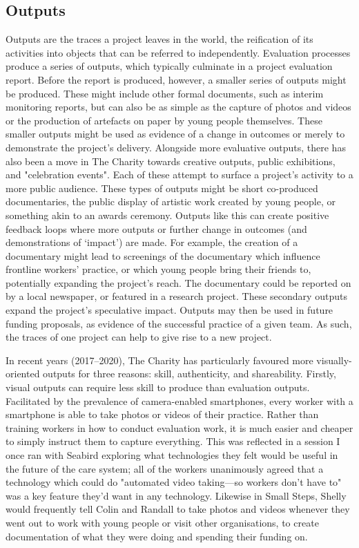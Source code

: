 \subsection{Outputs}
\label{subsec:6-3-2-outputs}
Outputs are the traces a project leaves in the world, the reification of its activities into objects that can be referred to independently. Evaluation processes produce a series of outputs, which typically culminate in a project evaluation report. Before the report is produced, however, a smaller series of outputs might be produced. These might include other formal documents, such as interim monitoring reports, but can also be as simple as the capture of photos and videos or the production of artefacts on paper by young people themselves. These smaller outputs might be used as evidence of a change in outcomes or merely to demonstrate the project's delivery.  Alongside more evaluative outputs, there has also been a move in The Charity towards creative outputs, public exhibitions, and "celebration events". Each of these attempt to surface a project's activity to a more public audience. These types of outputs might be short co-produced documentaries, the public display of artistic work created by young people, or something akin to an awards ceremony. Outputs like this can create positive feedback loops where more outputs or further change in outcomes (and demonstrations of `impact') are made. For example, the creation of a documentary might lead to screenings of the documentary which influence frontline workers' practice, or which young people bring their friends to, potentially expanding the project's reach. The documentary could be reported on by a local newspaper, or featured in a research project. These secondary outputs expand the project's speculative impact. Outputs may then be used in future funding proposals, as evidence of the successful practice of a given team. As such, the traces of one project can help to give rise to a new project.

In recent years (2017–2020), The Charity has particularly favoured more visually-oriented outputs for three reasons: skill, authenticity, and shareability. Firstly, visual outputs can require less skill to produce than evaluation outputs. Facilitated by the prevalence of camera-enabled smartphones, every worker with a smartphone is able to take photos or videos of their practice. Rather than training workers in how to conduct evaluation work, it is much easier and cheaper to simply instruct them to capture everything. This was reflected in a session I once ran with Seabird exploring what technologies they felt would be useful in the future of the care system; all of the workers unanimously agreed that a technology which could do "automated video taking—so workers don’t have to" was a key feature they'd want in any technology. Likewise in Small Steps, Shelly would frequently tell Colin and Randall to take photos and videos whenever they went out to work with young people or visit other organisations, to create documentation of what they were doing and spending their funding on. 

